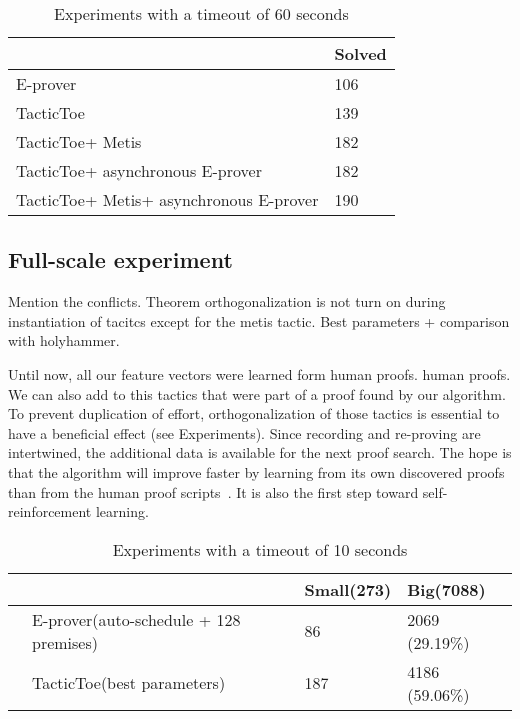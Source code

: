\documentclass[runningheads,a4paper,draft]{svjour3}
\def\eprover{\textsf{E-prover}\xspace}
\def\metis{\textsf{Metis}\xspace}
\def\tactictoe{\textsf{TacticToe}\xspace}
\newcommand{\ra}[1]{\renewcommand{\arraystretch}{#1}}
\begin{document}
\begin{table}[h!]
\centering\ra{1.3}
\small
\begin{tabular}{ll}
\toprule
  & Solved \\
\midrule
   \eprover &  106 \\
   \tactictoe &  139 \\
   \tactictoe + \metis & 182 \\
   \tactictoe + asynchronous \eprover & 182 \\
   \tactictoe + \metis + asynchronous \eprover & 190 \\
  
\bottomrule
\end{tabular}
\caption{Experiments with a timeout of 60 seconds \label{tab:param}}
\end{table}

\subsection{Full-scale experiment}

Mention the conflicts.
Theorem orthogonalization is not turn on during instantiation of tacitcs except 
for the metis tactic.
Best parameters + comparison with holyhammer.




Until now, all our feature vectors were learned form human proofs. 
human proofs. We can also add to this tactics that were part of a proof found 
by our algorithm. To prevent duplication of effort, orthogonalization of those 
tactics is essential to have a beneficial effect (see Experiments).
Since recording and re-proving are intertwined, the 
additional data is available for the next proof search.
The hope is that the algorithm will improve faster by learning from its own 
discovered proofs than from the human proof 
scripts~\cite{DBLP:conf/cade/Urban07}. It is also the first step toward 
self-reinforcement learning.





\begin{table}[h!]
\centering\ra{1.3}
\small
\begin{tabular}{llll}
\toprule
  & & Small(273) & Big(7088) \\
\midrule
  & \eprover (auto-schedule + 128 premises) & 86 & 2069 (29.19\%)\\ 
  & \tactictoe (best parameters) & 187 & 4186 (59.06\%) \\
\bottomrule
\end{tabular}
\caption{Experiments with a timeout of 10 seconds \label{tab:_param}}
\end{table}
\end{document}
